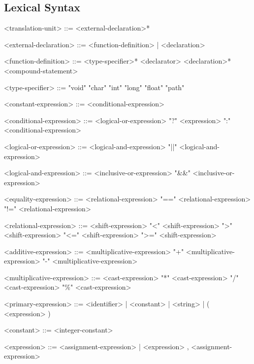 \documentclass{article}
\begin{document}
\subsection{Lexical Syntax}

\begin{grammar}
<translation-unit> ::= {<external-declaration>}*

<external-declaration> ::= <function-definition>
                         | <declaration>

<function-definition> ::= {<type-specifier>}* <declarator> {<declaration>}* <compound-statement>

<type-specifier> ::= "void"
\alt "char"
\alt "int"
\alt "long"
\alt "float"
\alt "path"

<constant-expression> ::= <conditional-expression>

<conditional-expression> ::= <logical-or-expression>
 "?" <expression> ":" <conditional-expression>

<logical-or-expression> ::= <logical-and-expression>
 "||" <logical-and-expression>

<logical-and-expression> ::= <inclusive-or-expression>
 "&&" <inclusive-or-expression>

<equality-expression> ::= <relational-expression>
 "==" <relational-expression>
 "!=" <relational-expression>

<relational-expression> ::= <shift-expression>
 "<" <shift-expression>
 ">" <shift-expression>
 "<=" <shift-expression>
 ">=" <shift-expression>

<additive-expression> ::= <multiplicative-expression>
 "+" <multiplicative-expression>
 "-" <multiplicative-expression>

<multiplicative-expression> ::= <cast-expression>
 "*" <cast-expression>
 "/" <cast-expression>
 "\%" <cast-expression>

<primary-expression> ::= <identifier> | <constant> | <string> | ( <expression> )

<constant> ::= <integer-constant>

<expression> ::= <assignment-expression> | <expression> , <assignment-expression>


\end{grammar}
\end{document}
